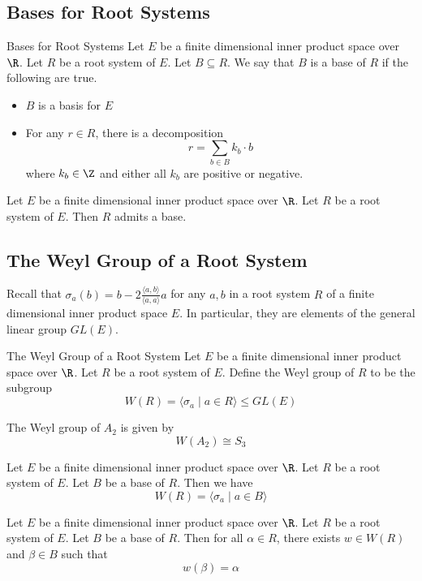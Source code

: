\documentclass[a4paper]{article}
\begin{document}
\subsection{Bases for Root Systems}
\begin{defn}{Bases for Root Systems}{} Let $E$ be a finite dimensional inner product space over $\R$. Let $R$ be a root system of $E$. Let $B\subseteq R$. We say that $B$ is a base of $R$ if the following are true. 
\begin{itemize}
\item $B$ is a basis for $E$
\item For any $r\in R$, there is a decomposition $$r=\sum_{b\in B}k_b\cdot b$$ where $k_b\in\Z$ and either all $k_b$ are positive or negative. 
\end{itemize}
\end{defn}

\begin{prp}{}{} Let $E$ be a finite dimensional inner product space over $\R$. Let $R$ be a root system of $E$. Then $R$ admits a base. 
\end{prp}

\subsection{The Weyl Group of a Root System}
Recall that $\sigma_a(b)=b-2\frac{\langle a,b\rangle}{\langle a,a\rangle}a$ for any $a,b$ in a root system $R$ of a finite dimensional inner product space $E$. In particular, they are elements of the general linear group $GL(E)$. 

\begin{defn}{The Weyl Group of a Root System}{} Let $E$ be a finite dimensional inner product space over $\R$. Let $R$ be a root system of $E$. Define the Weyl group of $R$ to be the subgroup $$W(R)=\langle\sigma_a\;|\;a\in R\rangle\leq GL(E)$$
\end{defn}

\begin{eg}{}{} The Weyl group of $A_2$ is given by $$W(A_2)\cong S_3$$
\end{eg}

\begin{prp}{}{} Let $E$ be a finite dimensional inner product space over $\R$. Let $R$ be a root system of $E$. Let $B$ be a base of $R$. Then we have $$W(R)=\langle\sigma_a\;|\;a\in B\rangle$$
\end{prp}

\begin{lmm}{}{} Let $E$ be a finite dimensional inner product space over $\R$. Let $R$ be a root system of $E$. Let $B$ be a base of $R$. Then for all $\alpha\in R$, there exists $w\in W(R)$ and $\beta\in B$ such that $$w(\beta)=\alpha$$
\end{lmm}
\end{document}
